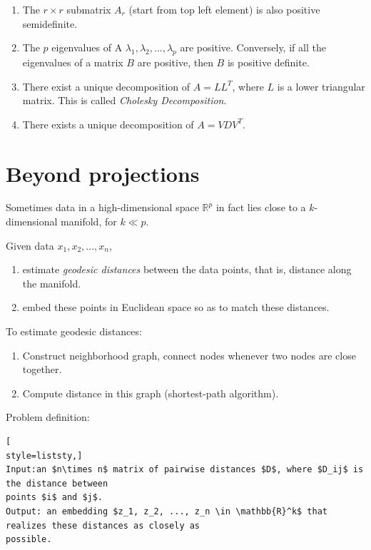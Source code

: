 \begin{enumerate}
    \item The $r \times r$ submatrix $A_r$ (start from top left element) is also positive
    semidefinite.
    \item The $p$ eigenvalues of A $\lambda_1, \lambda_2, ..., \lambda_p$ are positive.
    Conversely, if all the eigenvalues of a matrix $B$ are
    positive, then $B$ is positive definite.
    
    \item There exist a unique decomposition of $A = LL^T$, where $L$ is a lower triangular
    matrix. This is called \textit{Cholesky Decomposition}. 
    \item There exists a unique decomposition of $A = VDV^T$.
    
\end{enumerate}
        
  

\section{Beyond projections} 
Sometimes data in a high-dimensional space $\mathbb{R}^p$ in fact
lies close to a $k$-dimensional manifold, for $k\ll p$.

Given data $x_1, x_2, ..., x_n$,
\begin{enumerate}
\item estimate \textit{geodesic distances} between the data points, that is, distance along the manifold.
\item embed these points in Euclidean space so as to match these distances.
\end{enumerate}

To estimate geodesic distances:
\begin{enumerate}
   \item Construct neighborhood graph, connect nodes whenever two nodes are close together.
   \item Compute distance in this graph (shortest-path algorithm).  
\end{enumerate}

 Problem definition:
\begin{lstlisting}[
style=liststy,] 
Input:an $n\times n$ matrix of pairwise distances $D$, where $D_ij$ is the distance between 
points $i$ and $j$.
Output: an embedding $z_1, z_2, ..., z_n \in \mathbb{R}^k$ that realizes these distances as closely as 
possible.
\end{lstlisting}

